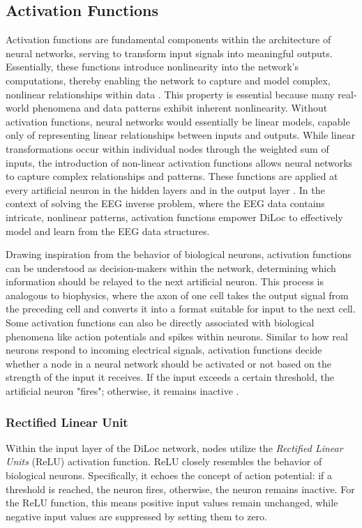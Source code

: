 \documentclass[a4paper, UKenglish, 11pt]{uiomaster}
\begin{document}
\subsection{Activation Functions}
Activation functions are fundamental components within the architecture of neural networks, serving to transform input signals into meaningful outputs. Essentially, these functions introduce nonlinearity into the network's computations, thereby enabling the network to capture and model complex, nonlinear relationships within data \cite{sharma2017activation}. This property is essential because many real-world phenomena and data patterns exhibit inherent nonlinearity. Without activation functions, neural networks would essentially be linear models, capable only of representing linear relationships between inputs and outputs. While linear transformations occur within individual nodes through the weighted sum of inputs, the introduction of non-linear activation functions allows neural networks to capture complex relationships and patterns. These functions are applied at every artificial neuron in the hidden layers and in the output layer \cite{choose_activation_function}. In the context of solving the EEG inverse problem, where the EEG data contains intricate, nonlinear patterns, activation functions empower DiLoc to effectively model and learn from the EEG data structures.

Drawing inspiration from the behavior of biological neurons, activation functions can be understood as decision-makers within the network, determining which information should be relayed to the next artificial neuron. This process is analogous to biophysics, where the axon of one cell takes the output signal from the preceding cell and converts it into a format suitable for input to the next cell. Some activation functions can also be directly associated with biological phenomena like action potentials and spikes within neurons. Similar to how real neurons respond to incoming electrical signals, activation functions decide whether a node in a neural network should be activated or not based on the strength of the input it receives. If the input exceeds a certain threshold, the artificial neuron "fires"; otherwise, it remains inactive \cite{analyticsvidhya_activationfunctions}.


\subsubsection{Rectified Linear Unit}
Within the input layer of the DiLoc network, nodes utilize the \emph{Rectified Linear Units} (ReLU) activation function.  ReLU closely resembles the behavior  of biological neurons. Specifically, it echoes the concept of action potential: if a threshold is reached, the neuron fires, otherwise, the neuron remains inactive. For the ReLU function, this means positive input values remain unchanged, while negative input values are suppressed by setting them to zero.
\end{document}

